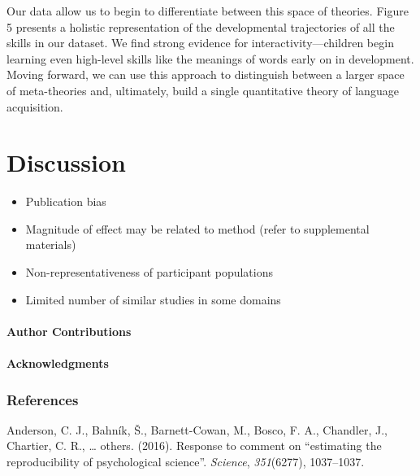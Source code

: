 \documentclass[english,floatsintext,man]{apa6}
\newcounter{author}
\begin{document}
Our data allow us to begin to differentiate between this space of
theories. Figure 5 presents a holistic representation of the
developmental trajectories of all the skills in our dataset. We find
strong evidence for interactivity---children begin learning even
high-level skills like the meanings of words early on in development.
Moving forward, we can use this approach to distinguish between a larger
space of meta-theories and, ultimately, build a single quantitative
theory of language acquisition.

\section{Discussion}\label{discussion}

\begin{itemize}
\item
  Publication bias
\item
  Magnitude of effect may be related to method (refer to supplemental
  materials)
\item
  Non-representativeness of participant populations
\item
  Limited number of similar studies in some domains
\end{itemize}

\paragraph{Author Contributions}\label{author-contributions}

\paragraph{Acknowledgments}\label{acknowledgments}

\newpage

\subsubsection{References}\label{references}

\setlength{\parindent}{-0.5in} \setlength{\leftskip}{0.5in}
\setlength{\parskip}{8pt}

\hypertarget{refs}{}
\hypertarget{ref-anderson2016response}{}
Anderson, C. J., Bahník, Š., Barnett-Cowan, M., Bosco, F. A., Chandler,
J., Chartier, C. R., \ldots{} others. (2016). Response to comment on
``estimating the reproducibility of psychological science''.
\emph{Science}, \emph{351}(6277), 1037--1037.
\end{document}
